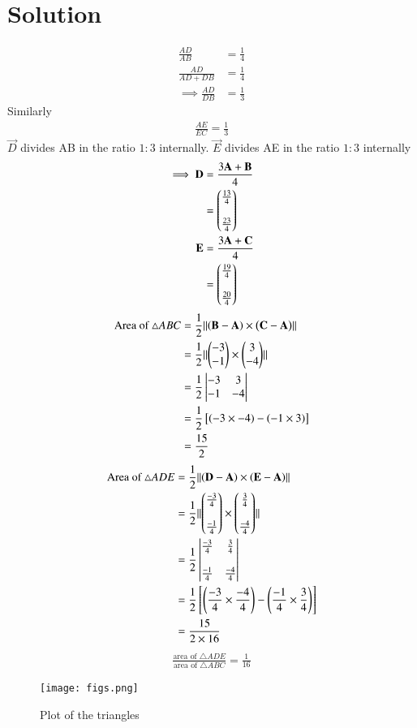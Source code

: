 \documentclass[journal,12pt,twocolumn]{IEEEtran}
\begin{document}
\section{Solution}
\begin{align}
    \frac{AD}{AB}&=\frac{1}{4}\\
    \frac{AD}{AD+DB}&=\frac{1}{4}\\
    \implies \frac{AD}{DB}&=\frac{1}{3}
\end{align}
Similarly
\begin{align}
    \frac{AE}{EC}=\frac{1}{3}
\end{align}
$\vec{D}$ divides AB in the ratio $1:3$ internally. $\vec{E}$ divides AE in the ratio $1:3$ internally
\begin{align}
    \implies \mathbf{D} &=\frac{3\mathbf{A}+\mathbf{B}}{4}\\
    &=\begin{pmatrix}\frac{13}{4}\\\\\frac{23}{4}\end{pmatrix}\\
    \mathbf{E} &=\frac{3\mathbf{A}+\mathbf{C}}{4}\\
    &=\begin{pmatrix}\frac{19}{4}\\\\\frac{20}{4}\end{pmatrix}
\end{align}
\begin{align}
    \text{Area of } \triangle ABC &= \frac{1}{2}\lVert\left(\mathbf{B-A}\right) \times \left(\mathbf{C-A}\right)\rVert\\
    &=\frac{1}{2}\lVert\begin{pmatrix}-3\\-1\end{pmatrix}\times \begin{pmatrix}3\\-4\end{pmatrix}\rVert\\
        &=\frac{1}{2}\begin{vmatrix}
    -3&3\\
    -1&-4
    \end{vmatrix}\\
    &=\frac{1}{2}{}\left[\left(-3\times -4\right)-\left(-1 \times 3\right)\right]\\
    &=\frac{15}{2}
\end{align}
\begin{align}
    \text{Area of } \triangle ADE &= \frac{1}{2}\lVert\left(\mathbf{D-A}\right) \times \left(\mathbf{E-A}\right)\rVert\\
    &=\frac{1}{2}\lVert\begin{pmatrix}\frac{-3}{4}\\\\\frac{-1}{4}\end{pmatrix}\times \begin{pmatrix}\frac{3}{4}\\\\\frac{-4}{4}\end{pmatrix}\rVert\\
    &=\frac{1}{2}\begin{vmatrix}
    \frac{-3}{4}&\frac{3}{4}\\\\
    \frac{-1}{4}&\frac{-4}{4}
    \end{vmatrix}\\
    &=\frac{1}{2}{}\left[\left(\frac{-3}{4}\times \frac{-4}{4}\right)-\left(\frac{-1}{4} \times \frac{3}{4}\right)\right]\\
    &=\frac{15}{2\times16}
\end{align}
\begin{align}
    \frac{\text{area of } \triangle ADE}{\text{area of } \triangle ABC}=\frac{1}{16}
\end{align}
\begin{figure}[!h]
 \centering
 \texttt{[image: figs.png]}
 \caption{Plot of the triangles}
 \label{plot}
\end{figure}
\end{document}
